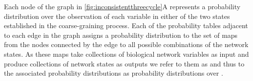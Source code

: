 Each node of the graph in \ref{fig:inconsistentthreecycle}A represents a probability distribution over the observation of each variable in either of the two states established in the coarse-graining process.
Each of the probability tables adjacent to each edge in the graph assigns a probability distribution to the set of maps from the nodes connected by the edge to all possible combinations of the network states. As these maps take collections of biological network variables as input and produce collections of network states as outputs we refer to them as \gnpm{} and thus to the associated probability distributions as probability distributions over \gnpm{}.

